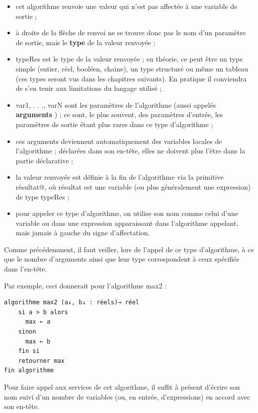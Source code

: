 \documentclass[11pt,a4paper]{article}
\begin{document}
            \par
        
					\begin{itemize}
				
			\item cet algorithme renvoie une valeur qui n'est pas affect\'ee \`a une variable de sortie ;
			\item \`a droite de la fl\`eche de renvoi ne se trouve donc pas le nom d'un param\`etre de sortie,
            mais le \textbf{type} de la valeur renvoy\'ee ;
			\item typeRes est le type de la valeur renvoy\'ee ; en th\'eorie, ce peut \^etre un type simple
            (entier, r\'eel, bool\'een, chaine), un type structur\'e ou m\^eme un tableau (ces
            types seront vus dans les chapitres suivants). En pratique il conviendra de s'en tenir
            aux limitations du langage utilis\'e ;
			\item var1, . . ., varN sont les param\`etres de l'algorithme
            (aussi appel\'es \textbf{arguments} ) ; ce sont, le
            plus souvent, des param\`etres d'entr\'ee, les param\`etres de sortie \'etant plus rares dans
            ce type d'algorithme ;
			\item ces arguments deviennent automatiquement des variables locales de l'algorithme ; d\'eclar\'ees
            dans son en-t\^ete, elles ne doivent plus l'\^etre dans la partie d\'eclarative ;
			\item la valeur renvoy\'ee est d\'efinie \`a la fin de l'algorithme via la primitive 
            \verb@retourner résultat@, o\`u
            r\'esultat est une variable (ou plus g\'en\'eralement une expression) de type typeRes ;
			\item pour appeler ce type d'algorithme, on utilise son nom comme celui d'une variable ou
            dans une expression apparaissant dans l'algorithme appelant, mais jamais \`a gauche du
            signe d'affectation.
					\end{itemize}
				
            \par
        
          Comme pr\'ec\'edemment, il faut veiller, lors de l'appel de ce type d'algorithme, \`a ce que le
          nombre d'arguments ainsi que leur type correspondent \`a ceux sp\'ecifi\'es dans l'en-t\^ete.
        
            \par
        Par exemple, ceci donnerait pour l'algorithme max2 : 
            \par
        \begin{verbatim}
algorithme max2 (a↓, b↓ : réels)→ réel
    si a > b alors
      max ← a
    sinon
      max ← b
    fin si
    retourner max
fin algorithme
      \end{verbatim}
        Pour faire appel aux services de cet algorithme, il suffit \`a pr\'esent d'\'ecrire son nom suivi d'un
        nombre de variables (ou, en entr\'ee, d'expressions) en accord avec son en-t\^ete. 
      
\end{document}
